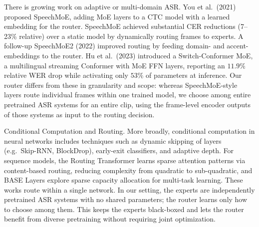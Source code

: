 \documentclass[journal]{IEEEtran}
\begin{document}
There is growing work on adaptive or multi-domain ASR. You et al.\
(2021) proposed SpeechMoE, adding MoE layers to a CTC model with a
learned embedding for the router. SpeechMoE achieved substantial CER
reductions (7--23\% relative) over a static model by dynamically
routing frames to experts. A follow-up SpeechMoE2 (2022) improved
routing by feeding domain- and accent-embeddings to the router.
Hu et al.\ (2023) introduced a Switch-Conformer MoE, a multilingual
streaming Conformer with MoE FFN layers, reporting an $11.9\%$
relative WER drop while activating only $53\%$ of parameters at
inference. Our router differs from these in granularity and scope:
whereas SpeechMoE-style layers route individual frames within one
trained model, we choose among entire pretrained ASR systems for an
entire clip, using the frame-level encoder outputs of those systems
as input to the routing decision.

Conditional Computation and Routing. More broadly, conditional
computation in neural networks includes techniques such as dynamic
skipping of layers (e.g.\ Skip-RNN, BlockDrop), early-exit
classifiers, and adaptive depth. For sequence models, the Routing
Transformer learns sparse attention patterns via content-based
routing, reducing complexity from quadratic to sub-quadratic, and
BASE Layers explore sparse capacity allocation for multi-task
learning. These works route within a single network. In our setting,
the experts are independently pretrained ASR systems with no shared
parameters; the router learns only how to choose among them. This
keeps the experts black-boxed and lets the router benefit from
diverse pretraining without requiring joint optimization.

\end{document}
